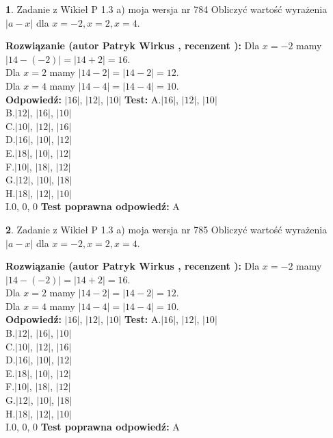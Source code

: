 \documentclass[12pt, a4paper]{article}
\theoremstyle{definition} %
\newtheorem{zad}{}
\newcommand{\zadStart}[1]{\begin{zad}#1\newline}
\newcommand{\zadStop}{\end{zad}}
\newcommand{\rozwStart}[2]{\noindent \textbf{Rozwiązanie (autor #1 , recenzent #2): }\newline}
\newcommand{\rozwStop}{\newline}
\newcommand{\odpStart}{\noindent \textbf{Odpowiedź:}\newline}
\newcommand{\odpStop}{\newline}
\newcommand{\testStart}{\noindent \textbf{Test:}\newline}
\newcommand{\testStop}{\newline}
\newcommand{\kluczStart}{\noindent \textbf{Test poprawna odpowiedź:}\newline}
\newcommand{\kluczStop}{\newline}
\begin{document}
\zadStart{Zadanie z Wikieł P 1.3 a) moja wersja nr 784}
Obliczyć wartość wyrażenia $|a - x|$ dla $x=-2,x=2,x=4$.
\zadStop
\rozwStart{Patryk Wirkus}{}
Dla $x = -2$ mamy $|14 - (-2)| = |14 + 2| = 16$.\\
Dla $x = 2$ mamy $|14 - 2| = |14 - 2| = 12$.\\
Dla $x = 4$ mamy $|14 - 4| = |14 - 4| = 10$.\\
\rozwStop
\odpStart
$|16|$, $|12|$, $|10|$
\odpStop
\testStart
A.$|16|$, $|12|$, $|10|$\\
B.$|12|$, $|16|$, $|10|$\\
C.$|10|$, $|12|$, $|16|$\\
D.$|16|$, $|10|$, $|12|$\\
E.$|18|$, $|10|$, $|12|$\\
F.$|10|$, $|18|$, $|12|$\\
G.$|12|$, $|10|$, $|18|$\\
H.$|18|$, $|12|$, $|10|$\\
I.$0$, $0$, $0$
\testStop
\kluczStart
A
\kluczStop



\zadStart{Zadanie z Wikieł P 1.3 a) moja wersja nr 785}
Obliczyć wartość wyrażenia $|a - x|$ dla $x=-2,x=2,x=4$.
\zadStop
\rozwStart{Patryk Wirkus}{}
Dla $x = -2$ mamy $|14 - (-2)| = |14 + 2| = 16$.\\
Dla $x = 2$ mamy $|14 - 2| = |14 - 2| = 12$.\\
Dla $x = 4$ mamy $|14 - 4| = |14 - 4| = 10$.\\
\rozwStop
\odpStart
$|16|$, $|12|$, $|10|$
\odpStop
\testStart
A.$|16|$, $|12|$, $|10|$\\
B.$|12|$, $|16|$, $|10|$\\
C.$|10|$, $|12|$, $|16|$\\
D.$|16|$, $|10|$, $|12|$\\
E.$|18|$, $|10|$, $|12|$\\
F.$|10|$, $|18|$, $|12|$\\
G.$|12|$, $|10|$, $|18|$\\
H.$|18|$, $|12|$, $|10|$\\
I.$0$, $0$, $0$
\testStop
\kluczStart
A
\kluczStop
\end{document}
